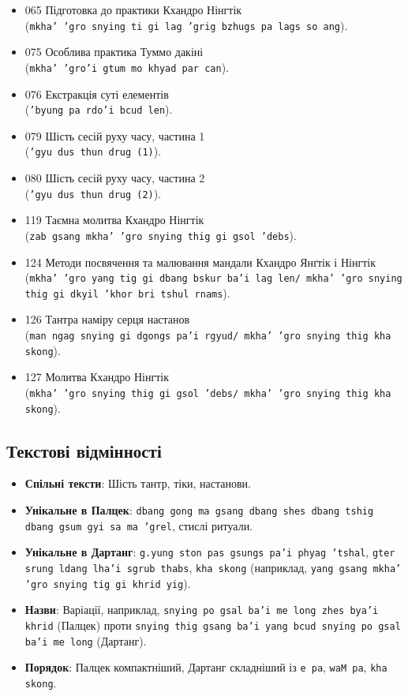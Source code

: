 \documentclass{article}
\begin{document}
\begingroup\raggedright
\begin{itemize}
\item 065 Підготовка до практики Кхандро Нінгтік \\ (\texttt{mkha' 'gro snying ti gi lag 'grig bzhugs pa lags so ang}).
\item 075 Особлива практика Туммо дакіні \\ (\texttt{mkha' 'gro'i gtum mo khyad par can}).
\item 076 Екстракція суті елементів \\ (\texttt{'byung pa rdo'i bcud len}).
\item 079 Шість сесій руху часу, частина 1 \\ (\texttt{'gyu dus thun drug (1)}).
\item 080 Шість сесій руху часу, частина 2 \\ (\texttt{'gyu dus thun drug (2)}).
\item 119 Таємна молитва Кхандро Нінгтік \\ (\texttt{zab gsang mkha' 'gro snying thig gi gsol 'debs}).
\item 124 Методи посвячення та малювання мандали Кхандро Янґтік і Нінгтік \\ (\texttt{mkha' 'gro yang tig gi dbang bskur ba'i lag len/ mkha' 'gro snying thig gi dkyil 'khor bri tshul rnams}).
\item 126 Тантра наміру серця настанов \\ (\texttt{man ngag snying gi dgongs pa'i rgyud/ mkha' 'gro snying thig kha skong}).
\item 127 Молитва Кхандро Нінгтік \\ (\texttt{mkha' 'gro snying thig gi gsol 'debs/ mkha' 'gro snying thig kha skong}).
\end{itemize}
\endgroup

\newpage
\subsection{Текстові відмінності}

\begingroup\raggedright
\begin{itemize}
    \item \textbf{Спільні тексти}: Шість тантр, тіки, настанови.
    \item \textbf{Унікальне в Палцек}: \texttt{dbang gong ma gsang dbang shes dbang tshig dbang gsum gyi sa ma 'grel}, стислі ритуали.
    \item \textbf{Унікальне в Дартанг}: \texttt{g.yung ston pas gsungs pa'i phyag 'tshal}, \texttt{gter srung ldang lha'i sgrub thabs}, \texttt{kha skong} (наприклад, \texttt{yang gsang mkha' 'gro snying tig gi khrid yig}).
    \item \textbf{Назви}: Варіації, наприклад, \texttt{snying po gsal ba'i me long zhes bya'i khrid} (Палцек) проти \texttt{snying thig gsang ba'i yang bcud snying po gsal ba'i me long} (Дартанг).
    \item \textbf{Порядок}: Палцек компактніший, Дартанг складніший із \texttt{e pa}, \texttt{waM pa}, \texttt{kha skong}.
\end{itemize}
\endgroup
\end{document}
